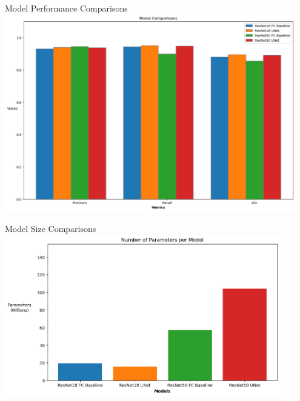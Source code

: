 \begin{frame}{Model Performance Comparisons}
    \centering
    \includegraphics[height=0.9\textheight,width=0.95\textwidth,keepaspectratio]{images/mm_performance.png}
\end{frame}

\begin{frame}{Model Size Comparisons}
    \centering
    \includegraphics[height=0.9\textheight,width=0.9\textwidth,keepaspectratio]{images/mm_params.png}
\end{frame}





